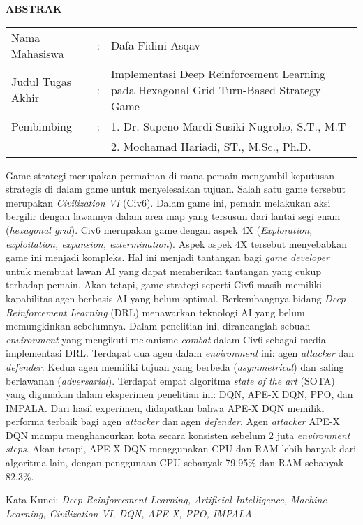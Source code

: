 \begin{center}
  \large\textbf{ABSTRAK}
\end{center}


\vspace{2ex}

\begingroup
  \setlength{\tabcolsep}{0pt}

  \noindent
  \begin{tabularx}{\textwidth}{l >{\centering}m{2em} X}
    Nama Mahasiswa    &:& Dafa Fidini Asqav \\

    Judul Tugas Akhir &:&	Implementasi Deep Reinforcement Learning pada Hexagonal Grid Turn-Based Strategy Game \\

    Pembimbing        &:& 1. Dr. Supeno Mardi Susiki Nugroho, S.T., M.T \\
                      & & 2. Mochamad Hariadi, ST., M.Sc., Ph.D. \\
  \end{tabularx}
\endgroup

Game strategi merupakan permainan di mana pemain mengambil keputusan strategis di dalam game untuk menyelesaikan tujuan. 
Salah satu game tersebut merupakan \emph{Civilization VI} (Civ6).
Dalam game ini, pemain melakukan aksi bergilir dengan lawannya dalam area map yang tersusun dari lantai segi enam (\emph{hexagonal grid}).
Civ6 merupakan game dengan aspek 4X (\emph{Exploration, exploitation, expansion, extermination}). Aspek aspek 4X tersebut menyebabkan game ini menjadi kompleks.
Hal ini menjadi tantangan bagi \emph{game developer} untuk membuat lawan AI yang dapat memberikan tantangan yang cukup terhadap pemain. 
Akan tetapi, game strategi seperti Civ6 masih memiliki kapabilitas agen berbasis AI yang belum optimal.
Berkembangnya bidang \emph{Deep Reinforcement Learning} (DRL) menawarkan teknologi AI yang belum memungkinkan sebelumnya.
Dalam penelitian ini, dirancanglah sebuah \emph{environment} yang mengikuti mekanisme \emph{combat} dalam Civ6
sebagai media implementasi DRL. Terdapat dua agen dalam \emph{environment} ini: agen \emph{attacker} dan \emph{defender}.
Kedua agen memiliki tujuan yang berbeda (\emph{asymmetrical}) dan saling berlawanan (\emph{adversarial}).
Terdapat empat algoritma \emph{state of the art} (SOTA) yang digunakan dalam eksperimen penelitian ini:
DQN, APE-X DQN, PPO, dan IMPALA. Dari hasil experimen, didapatkan bahwa APE-X DQN memiliki performa terbaik bagi agen \emph{attacker}
dan agen \emph{defender}. Agen \emph{attacker} APE-X DQN mampu menghancurkan kota secara konsisten sebelum 2 juta \emph{environment steps}.
Akan tetapi, APE-X DQN menggunakan CPU dan RAM lebih banyak dari algoritma lain, dengan penggunaan CPU sebanyak 79.95\% dan RAM sebanyak 82.3\%.

Kata Kunci: \emph{Deep Reinforcement Learning, Artificial Intelligence, Machine Learning, Civilization VI, DQN, APE-X, PPO, IMPALA}
